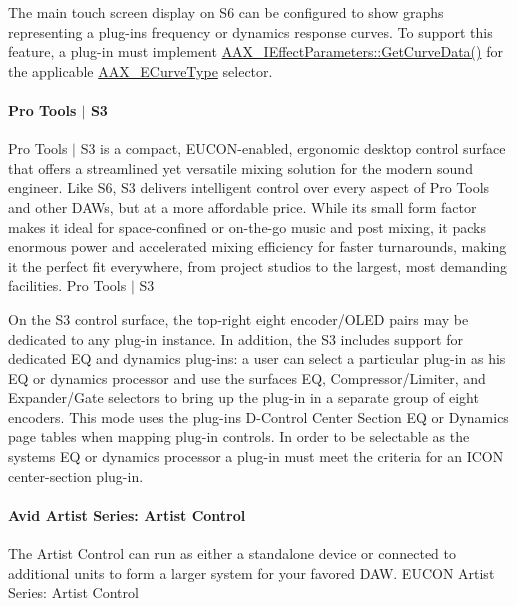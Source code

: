 The main touch screen display on S6 can be configured to show graphs representing a plug-\/in\textquotesingle{}s frequency or dynamics response curves. To support this feature, a plug-\/in must implement \hyperlink{a00342_gaa85bda4027342eb644a9c92a17da6d49}{A\+A\+X\+\_\+\+I\+Effect\+Parameters\+::\+Get\+Curve\+Data()} for the applicable \hyperlink{a00342_ga59c73d8f51c5c55d54a728eff39da884}{A\+A\+X\+\_\+\+E\+Curve\+Type} selector.

\hypertarget{a00363_subsubsection__avid_s3}{}\paragraph{Pro Tools $\vert$ S3}\label{a00363_subsubsection__avid_s3}
Pro Tools $\vert$ S3 is a compact, E\+U\+C\+O\+N-\/enabled, ergonomic desktop control surface that offers a streamlined yet versatile mixing solution for the modern sound engineer. Like S6, S3 delivers intelligent control over every aspect of Pro Tools and other D\+A\+Ws, but at a more affordable price. While its small form factor makes it ideal for space-\/confined or on-\/the-\/go music and post mixing, it packs enormous power and accelerated mixing efficiency for faster turnarounds, making it the perfect fit everywhere, from project studios to the largest, most demanding facilities.   Pro Tools $\vert$ S3 

On the S3 control surface, the top-\/right eight encoder/\+O\+L\+E\+D pairs may be dedicated to any plug-\/in instance. In addition, the S3 includes support for dedicated E\+Q and dynamics plug-\/ins\+: a user can select a particular plug-\/in as his E\+Q or dynamics processor and use the surface\textquotesingle{}s E\+Q, Compressor/\+Limiter, and Expander/\+Gate selectors to bring up the plug-\/in in a separate group of eight encoders. This mode uses the plug-\/in\textquotesingle{}s D-\/\+Control Center Section E\+Q or Dynamics page tables when mapping plug-\/in controls. In order to be selectable as the system\textquotesingle{}s E\+Q or dynamics processor a plug-\/in must meet the criteria for an I\+C\+O\+N center-\/section plug-\/in.

\hypertarget{a00363_subsubsection__avid_artist_series_mc_control_v2_}{}\paragraph{Avid Artist Series\+: Artist Control}\label{a00363_subsubsection__avid_artist_series_mc_control_v2_}
 The Artist Control can run as either a standalone device or connected to additional units to form a larger system for your favored D\+A\+W.   E\+U\+C\+O\+N Artist Series\+: Artist Control 

